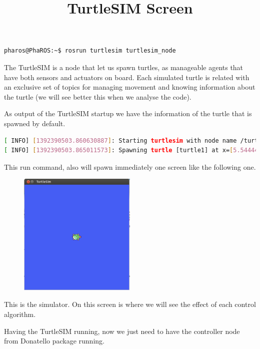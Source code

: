 \documentclass[a4paper,10pt,twoside]{book}
\begin{document}
			
			
			\begin{lstlisting}[language=bash,title={Starting up TurtleSIM}]
				pharos@PhaROS:~$ rosrun turtlesim turtlesim_node
			\end{lstlisting}
			
			
				The TurtleSIM is a node that let us spawn turtles, as manageable agents that have both sensors and actuators on board. 
				Each simulated turtle is related with an exclusive set of topics for managing movement and knowing information about the turtle (we will see better this when we analyse the code). 
				
				As output of the TurtleSIM startup we have the information of the turtle that is spawned by default.
			
			\begin{lstlisting}[language=bash,title={Starting up TurtleSIM - Output}]
[ INFO] [1392390503.860630887]: Starting turtlesim with node name /turtlesim
[ INFO] [1392390503.865011573]: Spawning turtle [turtle1] at x=[5.544445], y=[5.544445], theta=[0.000000]
			\end{lstlisting}
			
				This run command, also will spawn immediately one screen like the following one. 
			
			\begin{figure}[!htbp]
  		
  				\centering
    				\includegraphics[width=0.5\textwidth]{TurtleSIM.png}
				
				\centering
				\title{TurtleSIM Screen}
			\end{figure}
			
				This is the simulator. On this screen is where we will see the effect of each control algorithm.
			
				Having the TurtleSIM running, now we just need to have the controller node from Donatello package running. 
				
\end{document}

